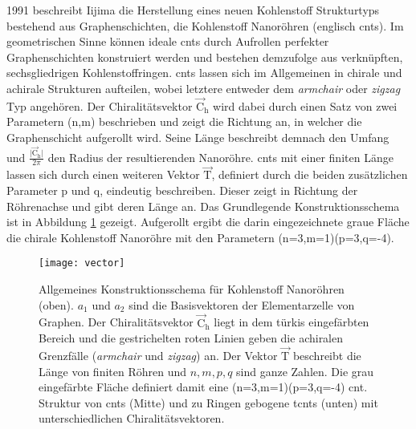 1991 beschreibt Iijima\supercite{iijima1991helical} die Herstellung eines neuen Kohlenstoff Strukturtyps bestehend aus Graphenschichten, die Kohlenstoff Nanoröhren (englisch \acp{cnt}). Im geometrischen Sinne können ideale \acp{cnt} durch Aufrollen perfekter Graphenschichten konstruiert werden und bestehen demzufolge aus verknüpften, sechsgliedrigen Kohlenstoffringen. \acp{cnt} lassen sich im Allgemeinen in chirale und achirale Strukturen aufteilen, wobei letztere entweder dem \textit{armchair} oder \textit{zigzag} Typ angehören. Der Chiralitätsvektor $\vec{\text{C}}_\text{h}$ wird dabei durch einen Satz von zwei Parametern (n,m) beschrieben und zeigt die Richtung an, in welcher die Graphenschicht aufgerollt wird. Seine Länge beschreibt demnach den Umfang und $\frac{\vert\vec{\text{C}}_\text{h}\vert}{2\pi}$ den Radius der resultierenden Nanoröhre. \acp{cnt} mit einer finiten Länge lassen sich durch einen weiteren Vektor $\vec{\text{T}}$, definiert durch die beiden zusätzlichen Parameter p und q, eindeutig beschreiben. Dieser zeigt in Richtung der Röhrenachse und gibt deren Länge an. Das Grundlegende Konstruktionsschema ist in Abbildung \ref{abb:chiralvector} gezeigt. Aufgerollt ergibt die darin eingezeichnete graue Fläche die chirale Kohlenstoff Nanoröhre mit den Parametern (n=3,m=1)(p=3,q=-4).
\begin{figure}[ht!]
	\centering
	\texttt{[image: vector]}
	\captionsetup{figurewithin = chapter}
	\captionsetup{font=small, labelfont=bf}\caption[Konstruktionsschema von (toroidalen) Kohlenstoff Nanoröhren]{Allgemeines Konstruktionsschema für Kohlenstoff Nanoröhren (oben). $a_1$ und $a_2$ sind die Basisvektoren der Elementarzelle von Graphen. Der Chiralitätsvektor $\vec{\text{C}}_\text{h}$ liegt in dem türkis eingefärbten Bereich und die gestrichelten roten Linien geben die achiralen Grenzfälle (\textit{armchair} und \textit{zigzag}) an. Der Vektor $\vec{\text{T}}$ beschreibt die Länge von finiten Röhren und $n,m,p,q$ sind ganze Zahlen. Die grau eingefärbte Fläche definiert damit eine (n=3,m=1)(p=3,q=-4) \ac{cnt}. Struktur von \acp{cnt} (Mitte) und zu Ringen gebogene \acp{tcnt} (unten) mit unterschiedlichen Chiralitätsvektoren.}
\label{abb:chiralvector}
\end{figure}


